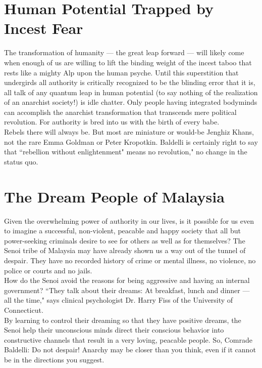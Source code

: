 \section*{Human Potential Trapped by Incest Fear}
The transformation of humanity --- the great leap forward --- will likely come when enough of us are willing to lift the binding weight of the incest taboo that rests like a mighty Alp upon the human psyche. Until this superstition that undergirds all authority is critically recognized to be the blinding error that it is, all talk of any quantum leap in human potential (to say nothing of the realization of an anarchist society!) is idle chatter. Only people having integrated bodyminds can accomplish the anarchist transformation that transcends mere political revolution. For authority is bred into us with the birth of every babe.\\
Rebels there will always be. But most are miniature or would-be Jenghiz Khans, not the rare Emma Goldman or Peter Kropotkin. Baldelli is certainly right to say that ``rebellion without enlightenment" means no revolution," no change in the status quo.

\section*{The Dream People of Malaysia}
Given the overwhelming power of authority in our lives, is it possible for us even to imagine a successful, non-violent, peacable and happy society that all but power-seeking criminals desire to see for others as well as for themselves? The Senoi tribe of Malaysia may have already shown us a way out of the tunnel of despair. They have no recorded history of crime or mental illness, no violence, no police or courts and no jails.\\
How do the Senoi avoid the reasons for being aggressive and having an internal government? ``They talk about their dreams: At breakfast, lunch and dinner --- all the time," says clinical psychologist Dr. Harry Fiss of the University of Connecticut.\\
By learning to control their dreaming so that they have positive dreams, the Senoi help their unconscious minds direct their conscious behavior into constructive channels that result in a very loving, peacable people. So, Comrade Baldelli: Do not despair! Anarchy may be closer than you think, even if it cannot be in the directions you suggest.
